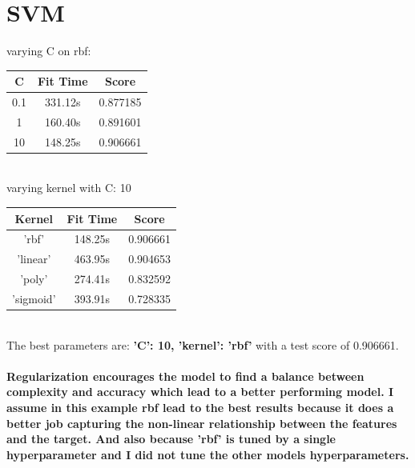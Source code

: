 \documentclass{article}
\begin{document}
\section{SVM}
varying C on rbf: 
\begin{tabular}{|c | c c|}
\hline
C & Fit Time & Score \\ [0.5ex] 
\hline
0.1 & 331.12s & 0.877185 \\
1 & 160.40s & 0.891601 \\
\rowcolor{LightYellow}
10 & 148.25s & 0.906661 \\
\hline
\end{tabular}
\\ 
varying kernel with C: 10 
\begin{tabular}{|c | c c|}
	\hline
Kernel & Fit Time & Score \\ [0.5ex] 
	\hline
	\rowcolor{LightYellow}
  'rbf' & 148.25s & 0.906661 \\
  'linear' & 463.95s & 0.904653 \\
  'poly' & 274.41s & 0.832592 \\
  'sigmoid' & 393.91s & 0.728335 \\
	\hline
\end{tabular}
\\ 
The best parameters are: \textbf{'C': 10, 'kernel': 'rbf'} with a test score of 0.906661.

\paragraph[Comment]{
Regularization encourages the model to find a balance between complexity and accuracy which lead to a better performing model.
I assume in this example rbf lead to the best results because it does a better job capturing the non-linear relationship between the features and the target.
And also because 'rbf' is tuned by a single hyperparameter and I did not tune the other models hyperparameters.
}

\end{document}
